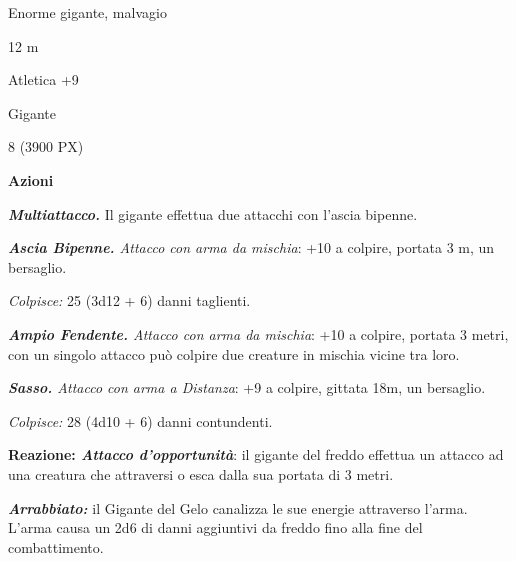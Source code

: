 \begin{multicols}{2}
{
\begin{description}[noitemsep, topsep=0pt, parsep=0pt, partopsep=0pt, itemsep=1pt, leftmargin=2.35cm,  labelwidth=2.2cm, itemindent=0cm, listparindent=0pt] %
\setlength{\baselineskip}{10pt}
\item[\textbf{Taglia/Tipo}] Enorme gigante, malvagio
\item[\textbf{Caratt.}] 
\item[\textbf{Punti Ferita}] 
\item[\textbf{Movimento}] 12 m
\item[\textbf{Tiri Salvez.}] 
\item[\textbf{Comp.}] Atletica +9
\item[\textbf{Linguaggi}] Gigante
\item[\textbf{Sfida}] 8 (3900 PX)
\end{description}
\smallskip

\textbf{Azioni}

\emph{\textbf{Multiattacco.}} Il gigante effettua due attacchi con l'ascia bipenne.

\emph{\textbf{Ascia Bipenne.} Attacco con arma da mischia}: +10 a colpire, portata 3 m, un bersaglio.

\emph{Colpisce:} 25 (3d12 + 6) danni taglienti.

\emph{\textbf{Ampio Fendente.} Attacco con arma da mischia}: +10 a colpire, portata 3 metri, con un singolo attacco può colpire due creature in mischia vicine tra loro.

\emph{\textbf{Sasso.} Attacco con arma a Distanza}: +9 a colpire, gittata 18m, un bersaglio.

\emph{Colpisce:} 28 (4d10 + 6) danni contundenti.

\textbf{Reazione: \emph{Attacco d'opportunità}}: il gigante del freddo effettua un attacco ad una creatura che attraversi o esca dalla sua portata di 3 metri.

\emph{\textbf{Arrabbiato:}} il Gigante del Gelo canalizza le sue energie attraverso l'arma. L'arma causa un 2d6 di danni aggiuntivi da freddo fino alla fine del combattimento.

}
\end{multicols}
